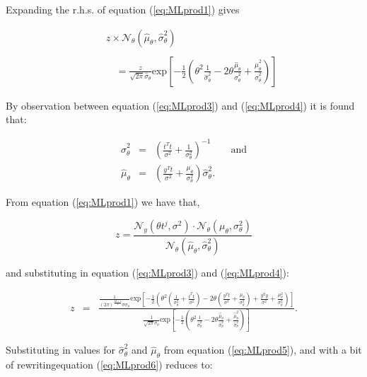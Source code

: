 Expanding the r.h.s. of equation (\ref{eq:MLprod1}) gives

\begin{eqnarray}\label{eq:MLprod4}
& & z \times \mathcal{N}_\theta(\hat{\mu}_\theta,\hat{\sigma}^2_\theta) \\\nonumber{}\\\nonumber
& & \quad = \frac{z}{\sqrt{2 \pi}\hat{\sigma}_\theta}\textrm{exp}\left[-\frac{1}{2}\left(\theta^2\frac{1}{\hat{\sigma}^2_\theta} - 2\theta\frac{\hat{\mu}_\theta}{\hat{\sigma}^2_\theta} + \frac{\hat{\mu}_\theta^2}{\hat{\sigma}^2_\theta}  \right)\right]
\end{eqnarray}

By observation between equation (\ref{eq:MLprod3}) and (\ref{eq:MLprod4}) it is found that:

\begin{eqnarray}
\label{eq:MLprod5}
\hat{\sigma}^2_\theta &=& \left(\frac{t^T t}{\sigma^2} + \frac{1}{\sigma_\theta^2}\right)^{-1} \qquad \textrm{and}\\\nonumber
\hat{\mu}_\theta &=& \left(\frac{y^T t}{\sigma^2} + \frac{\mu_\theta}{\sigma^2_\theta}\right)\hat{\sigma}^2_\theta.
\end{eqnarray}

From equation (\ref{eq:MLprod1}) we have that,

\begin{equation}\label{eq:MLprod2}
z = \frac{\mathcal{N}_y(\theta t^j,\sigma^2)\cdot\mathcal{N}_\theta(\mu_\theta,\sigma^2_\theta)}{\mathcal{N}_\theta(\hat{\mu}_\theta,\hat{\sigma}^2_\theta)}
\end{equation}

and substituting in equation (\ref{eq:MLprod3}) and (\ref{eq:MLprod4}):

\begin{eqnarray}\label{eq:MLprod6}
z &=& \frac{\frac{1}{\left(2\pi\right)^{\frac{M+1}{2}} \sigma \sigma_\theta} \textrm{exp}\left[-\frac{1}{2}\left(\theta^2 \left(\frac{1}{\sigma_\theta^2}+\frac{t^T t}{\sigma^2}\right) - 2\theta\left(\frac{y^T t}{\sigma^2}+\frac{\mu_\theta}{\sigma_\theta^2}\right) + \frac{y^T y}{\sigma^2} +\frac{\mu_\theta^2}{\sigma_\theta^2}\right)\right]}{\frac{1}{\sqrt{2 \pi}\hat{\sigma}_\theta}\textrm{exp}\left[-\frac{1}{2}\left(\theta^2\frac{1}{\hat{\sigma}^2_\theta} - 2\theta\frac{\hat{\mu}_\theta}{\hat{\sigma}^2_\theta} + \frac{\hat{\mu}_\theta^2}{\hat{\sigma}^2_\theta}  \right)\right]}.
\end{eqnarray}

Substituting in values for $\hat{\sigma}^2_\theta$ and $\hat{\mu}_\theta$ from equation (\ref{eq:MLprod5}), and with a bit of rewriting\DIFaddbegin \DIFadd{, }\DIFaddend equation (\ref{eq:MLprod6}) reduces to:

